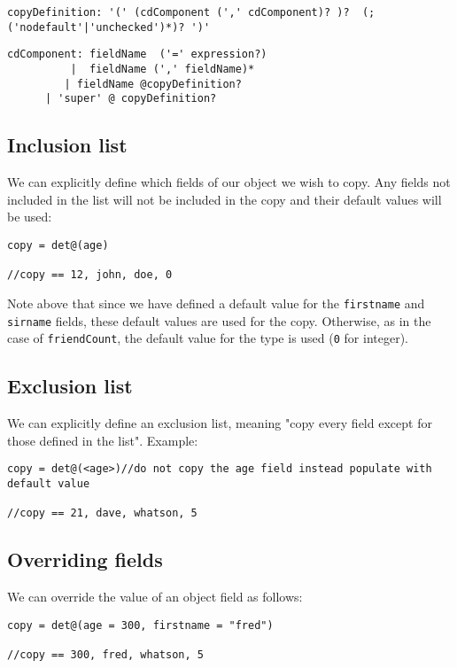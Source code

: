 \documentclass[conc-doc]{subfiles}
\begin{document}
\begin{center}
	\lstinline!copyDefinition: '(' (cdComponent (',' cdComponent)? )?  (; ('nodefault'|'unchecked')*)? ')'!
\end{center}

\begin{center}
\lstinline{cdComponent: fieldName  ('=' expression?) 	}\\
\lstinline{          |  fieldName (',' fieldName)* 	}\\
\lstinline{         | fieldName @copyDefinition?  	}\\
\lstinline{      | 'super' @ copyDefinition?}
\end{center}

\subsection{Inclusion list}
We can explicitly define which fields of our object we wish to copy. Any fields not included in the list will not be included in the copy and their default values will be used:

\begin{lstlisting}
copy = det@(age)

//copy == 12, john, doe, 0
\end{lstlisting}

Note above that since we have defined a default value for the \lstinline{firstname} and \lstinline{sirname} fields, these default values are used for the copy. Otherwise, as in the case of \lstinline{friendCount}, the default value for the type is used (\lstinline{0} for integer).

\subsection{Exclusion list}
We can explicitly define an exclusion list, meaning "copy every field except for those defined in the list". Example:
\begin{lstlisting}
copy = det@(<age>)//do not copy the age field instead populate with default value

//copy == 21, dave, whatson, 5
\end{lstlisting}

\subsection{Overriding fields}
We can override the value of an object field as follows:
\begin{lstlisting}
copy = det@(age = 300, firstname = "fred")

//copy == 300, fred, whatson, 5
\end{lstlisting}
\end{document}
